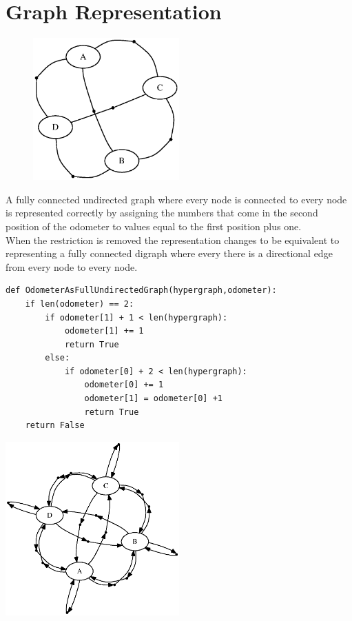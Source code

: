 \documentclass[12pt]{article}
\begin{document}
\section{Graph Representation}
\begin{figure}
  \begin{center}
    \includegraphics[width=0.5\textwidth]{FullGraph.eps}
  \end{center}
\end{figure}

A fully connected undirected graph where every node is connected to every node is represented correctly by assigning the numbers that come in the second position of the odometer to values equal to the first position plus one. \\

When the restriction is removed the representation changes to be equivalent to representing a fully connected digraph where every there is a directional edge from every node to every node. 
\begin{lstlisting}
def OdometerAsFullUndirectedGraph(hypergraph,odometer):
    if len(odometer) == 2:
        if odometer[1] + 1 < len(hypergraph):
            odometer[1] += 1
            return True
        else:
            if odometer[0] + 2 < len(hypergraph):
                odometer[0] += 1
                odometer[1] = odometer[0] +1
                return True
    return False
\end{lstlisting}

  \begin{center}
    \includegraphics[width=0.5\textwidth]{FullDirectedGraph.eps}
  \end{center}
\end{document}
